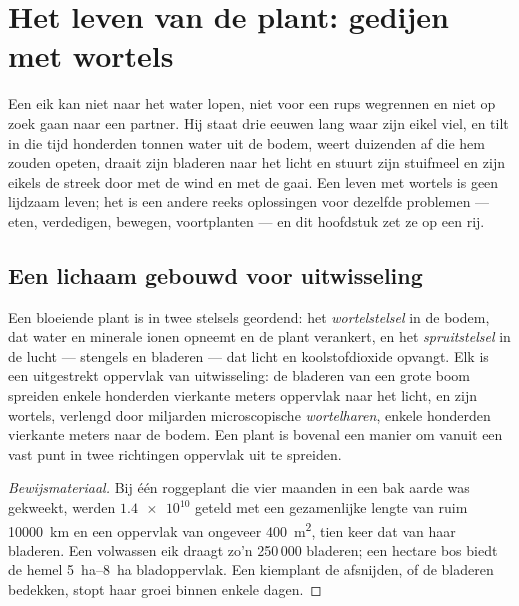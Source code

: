 \chapter{Het leven van de plant: gedijen met wortels}\label{ch:g12:plant-rooted-life}

Een eik kan niet naar het water lopen, niet voor een rups wegrennen en
niet op zoek gaan naar een partner. Hij staat drie eeuwen lang waar zijn
eikel viel, en tilt in die tijd honderden tonnen water uit de bodem, weert
duizenden  af die hem zouden opeten, draait zijn bladeren naar het
licht en stuurt zijn stuifmeel en zijn eikels de streek door met de wind
en met de gaai. Een leven met wortels is geen lijdzaam leven; het is een
andere reeks oplossingen voor dezelfde problemen --- eten, verdedigen,
bewegen, voortplanten --- en dit hoofdstuk zet ze op een rij.

\section{Een lichaam gebouwd voor uitwisseling}

\begin{proposition}\label{prop:g12:plant-rooted-life:surfaces}
Een bloeiende plant is in twee stelsels geordend: het
\emph{wortelstelsel} in de bodem, dat water en minerale ionen opneemt en
de plant verankert, en het \emph{spruitstelsel} in de lucht --- stengels
en bladeren --- dat licht en koolstofdioxide opvangt. Elk is een
uitgestrekt oppervlak van uitwisseling: de bladeren van een grote boom
spreiden enkele honderden vierkante meters oppervlak naar het licht, en
zijn wortels, verlengd door miljarden microscopische
\emph{wortelharen}, enkele honderden vierkante meters
naar de bodem. Een plant is bovenal een manier om vanuit een vast punt in
twee richtingen oppervlak uit te spreiden.
\end{proposition}
\begin{proof}[Bewijsmateriaal]
Bij één roggeplant die vier maanden in een bak aarde was gekweekt, werden
$\num{1.4e10}$  geteld met een gezamenlijke lengte van ruim
\qty{10000}{km} en een oppervlak van ongeveer \qty{400}{m^2}, tien keer
dat van haar bladeren. Een volwassen eik draagt zo'n 250\,000 bladeren;
een hectare bos biedt de hemel \qtyrange{5}{8}{ha} bladoppervlak. Een
kiemplant de  afsnijden, of de bladeren bedekken, stopt haar
groei binnen enkele dagen.
\end{proof}

